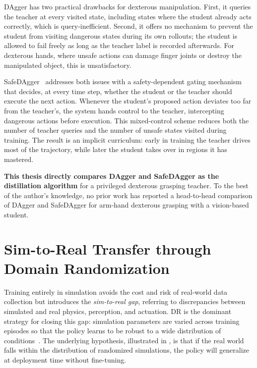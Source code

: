 DAgger has two practical drawbacks for dexterous manipulation.
First, it queries the teacher at every visited state, including states where the student already acts correctly, which is query-inefficient.
Second, it offers no mechanism to prevent the student from visiting dangerous states during its own rollouts; the student is allowed to fail freely as long as the teacher label is recorded afterwards.
For dexterous hands, where unsafe actions can damage finger joints or destroy the manipulated object, this is unsatisfactory.

SafeDAgger~\cite{Zhang2016} addresses both issues with a safety-dependent gating mechanism that decides, at every time step, whether the student or the teacher should execute the next action.
Whenever the student's proposed action deviates too far from the teacher's, the system hands control to the teacher, intercepting dangerous actions before execution.
This mixed-control scheme reduces both the number of teacher queries and the number of unsafe states visited during training.
The result is an implicit curriculum: early in training the teacher drives most of the trajectory, while later the student takes over in regions it has mastered.

\textbf{This thesis directly compares DAgger and SafeDAgger as the distillation algorithm} for a privileged dexterous grasping teacher.
To the best of the author's knowledge, no prior work has reported a head-to-head comparison of DAgger and SafeDAgger for arm-hand dexterous grasping with a vision-based student.

\section{Sim-to-Real Transfer through Domain Randomization}%
\label{sec:sim2real}%

Training entirely in simulation avoids the cost and risk of real-world data collection but introduces the \emph{sim-to-real gap}, referring to discrepancies between simulated and real physics, perception, and actuation.
\ac{DR} is the dominant strategy for closing this gap: simulation parameters are varied across training episodes so that the policy learns to be robust to a wide distribution of conditions~\cite{Tobin2017}.
The underlying hypothesis, illustrated in , is that if the real world falls within the distribution of randomized simulations, the policy will generalize at deployment time without fine-tuning.

